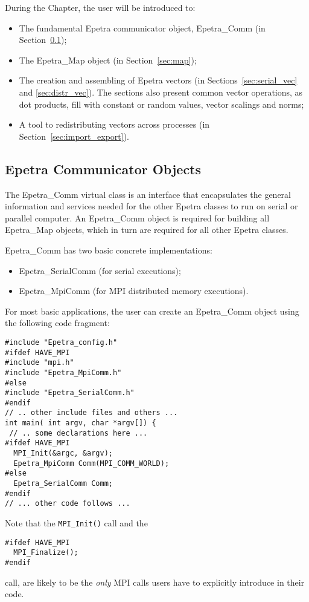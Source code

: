 \medskip

During the Chapter, the user will be introduced to:
\begin{itemize}
\item The fundamental Epetra communicator object, Epetra\_Comm (in
  Section~\ref{sec:comm});
\item The Epetra\_Map object (in Section~\ref{sec:map});
\item The creation and assembling of Epetra vectors (in
  Sections~\ref{sec:serial_vec} and \ref{sec:distr_vec}). The sections
  also present common vector operations, as dot products, fill with
  constant or random values, vector scalings and norms;
\item A tool to redistributing vectors across processes (in
  Section~\ref{sec:import_export}).
\end{itemize}


\subsection{Epetra Communicator Objects}
\label{sec:comm}

The Epetra\_Comm virtual class is an interface that encapsulates the
general information and services needed for the other Epetra classes to
run on serial or parallel computer. An Epetra\_Comm object is required
for building all Epetra\_Map objects, which in turn are required for all
other Epetra classes.

Epetra\_Comm has two basic concrete implementations:
\begin{itemize}
\item Epetra\_SerialComm (for serial executions);
\item Epetra\_MpiComm (for MPI distributed memory executions).
\end{itemize}

For most basic applications, the user can create an Epetra\_Comm object
using the following code fragment:
\begin{verbatim}
#include "Epetra_config.h"
#ifdef HAVE_MPI
#include "mpi.h"
#include "Epetra_MpiComm.h"
#else
#include "Epetra_SerialComm.h"
#endif
// .. other include files and others ...
int main( int argv, char *argv[]) {
 // .. some declarations here ...
#ifdef HAVE_MPI
  MPI_Init(&argc, &argv);
  Epetra_MpiComm Comm(MPI_COMM_WORLD);
#else
  Epetra_SerialComm Comm;
#endif
// ... other code follows ...
\end{verbatim}
Note that the \verb!MPI_Init()! call and the
\begin{verbatim}
#ifdef HAVE_MPI
  MPI_Finalize();
#endif
\end{verbatim}
call, are likely to be the {\em only} MPI calls users have to explicitly
introduce in their code.

